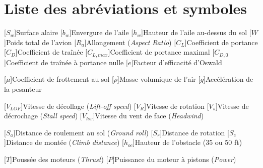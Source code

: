 

\section*{Liste des abréviations et symboles}

\begin{acronym}[VLOF] %
	
	\vspace{0.5cm} %
	
	[$S_w$]{Surface alaire}
	[$b_w$]{Envergure de l'aile} 
	[$h_w$]{Hauteur de l'aile au-dessus du sol} 
	[$W$]{Poids total de l'avion} 
	[$R_a$]{Allongement (\textit{Aspect Ratio})}
	[$C_L$]{Coefficient de portance} 
	[$C_D$]{Coefficient de traînée} 
	[$C_{L,max}$]{Coefficient de portance maximal}
	[$C_{D,0}$]{Coefficient de traînée à portance nulle} 
	[$e$]{Facteur d'efficacité d'Oswald} 
	
	[$\mu$]{Coefficient de frottement au sol}
	[$\rho$]{Masse volumique de l'air}
	[$g$]{Accélération de la pesanteur} 
	
	[$V_{LOF}$]{Vitesse de décollage (\textit{Lift-off speed})} 
	[$V_R$]{Vitesse de rotation} 
	[$V_s$]{Vitesse de décrochage (\textit{Stall speed})}
	[$V_{hw}$]{Vitesse du vent de face (\textit{Headwind})}
	
	[$S_a$]{Distance de roulement au sol (\textit{Ground roll})}
	[$S_r$]{Distance de rotation}
	[$S_c$]{Distance de montée (\textit{Climb distance})}
	[$h_{oc}$]{Hauteur de l'obstacle (35 ou 50 ft)}
	
	[$T$]{Poussée des moteurs (\textit{Thrust})}
	[$P$]{Puissance du moteur à pistons (\textit{Power})}
\end{acronym}

\cleardoublepage